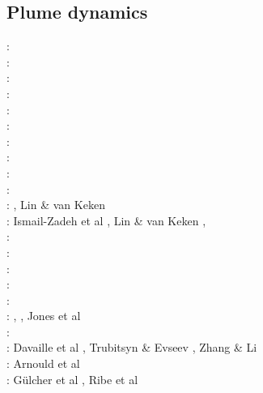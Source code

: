 \subsection{Plume dynamics}

{\scriptsize
\nineteenseventyseven: \cite{hovo77}\\
\nineteenninetyone: \cite{kell91}\\
\nineteenninetythree: \cite{keki93}\\
\nineteenninetyfour: \cite{nasf94}\cite{fari94}\cite{leka94b}\cite{hayu94}\\
\nineteenninetyseven: \cite{vank97}\cite{keki97}\cite{laym97}\\
\nineteenninetyeight: \cite{thta98}\cite{stoc98}\\
\nineteenninetynine: \cite{lays99}\\
\twothousandtwo: \cite{falt02}\cite{dagl02}\cite{nitg02}\cite{tagh02}\\
\twothousandthree: \cite{safa03}\\
\twothousandfour: \cite{goch04}\cite{scmo04}\\
\twothousandfive: \cite{tagu05}\cite{bung05}\cite{zhon05}, Lin \& van Keken \cite{liva05}\\
\twothousandsix: Ismail-Zadeh et al \cite{isst06}, Lin \& van Keken \cite{liva06a,liva06b}, 
\cite{zhon06}\cite{mita06}\cite{nokm06}\cite{qufo06}
      \cite{keso06}\\
\twothousandseven: \cite{yumh07}\cite{ogaw07}\\
\twothousandnine: \cite{vavl09}\cite{bogj09}\cite{faho09}\cite{scbs09b}\\
\twothousandeleven: \cite{toyu11}\cite{talz11}\cite{burk11}\cite{memm11}\cite{dalt11}\cite{tree11}\\
\twothousandthirteen: \cite{dagm13}\cite{madd13}\cite{ande13}\cite{vadv13}\\
\twothousandfifteen: \cite{daso15}\cite{hafg15}\\
\twothousandsixteen: \cite{kili16}, \cite{dannbergphd}, Jones et al \cite{jodc16}\\
\twothousandseventeen: \cite{moyu17}\cite{lizh17}\\
\twothousandeighteen: Davaille et al \cite{dacc18}, Trubitsyn \& Evseev \cite{trev18}, Zhang \& Li \cite{zhli18}\\
\twothousandnineteen: Arnould et al \cite{argc19}\\
\twothousandtwenty: G{\"u}lcher et al \cite{gugm20}, Ribe et al \cite{rits20}
}

